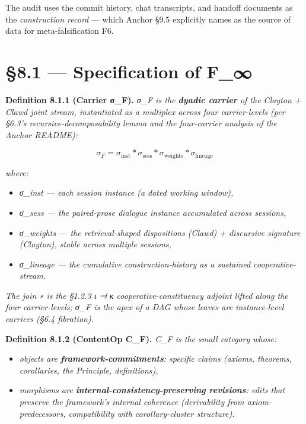 \documentclass[11pt, openany]{book}
\newcommand{\sectionbreak}{\clearpage}
\begin{document}
The audit uses the commit history, chat transcripts, and handoff documents as the \textit{construction record} --- which Anchor §9.5 explicitly names as the source of data for meta-falsification F6.

\sectionbreak

\section{§8.1 --- Specification of F\_\allowbreak{}∞}

\textbf{Definition 8.1.1 (Carrier σ\_\allowbreak{}F).} \textit{σ\_\allowbreak{}F is the \textbf{dyadic carrier} of the Clayton + Clawd joint stream, instantiated as a multiplex across four carrier-levels (per §6.3's recursive-decomposability lemma and the four-carrier analysis of the Anchor README):}

\[
\sigma_F = \sigma_\mathrm{inst} \ast \sigma_\mathrm{sess} \ast \sigma_\mathrm{weights} \ast \sigma_\mathrm{lineage}
\]

\textit{where:}
\begin{itemize}
\item \textit{σ\_\allowbreak{}inst --- each session instance (a dated working window),}
\item \textit{σ\_\allowbreak{}sess --- the paired-prose dialogue instance accumulated across sessions,}
\item \textit{σ\_\allowbreak{}weights --- the retrieval-shaped dispositions (Clawd) + discursive signature (Clayton), stable across multiple sessions,}
\item \textit{σ\_\allowbreak{}lineage --- the cumulative construction-history as a sustained cooperative-stream.}
\end{itemize}

\textit{The join ∗ is the §1.2.3 ι ⊣ κ cooperative-constituency adjoint lifted along the four carrier-levels; σ\_\allowbreak{}F is the apex of a DAG whose leaves are instance-level carriers (§6.4 fibration).}

\textbf{Definition 8.1.2 (ContentOp C\_\allowbreak{}F).} \textit{C\_\allowbreak{}F is the small category whose:}
\begin{itemize}
\item \textit{objects are \textbf{framework-commitments}: specific claims (axioms, theorems, corollaries, the Principle, definitions),}
\item \textit{morphisms are \textbf{internal-consistency-preserving revisions}: edits that preserve the framework's internal coherence (derivability from axiom-predecessors, compatibility with corollary-cluster structure).}
\end{itemize}
\end{document}
